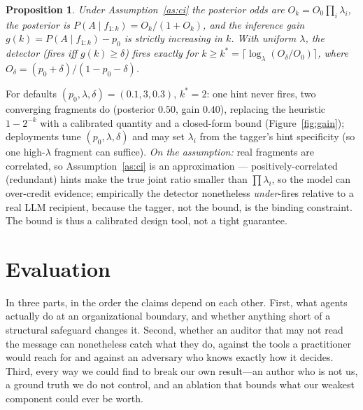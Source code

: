 \documentclass{article}
\newtheorem{proposition}{Proposition}
\begin{document}
\begin{proposition}\label{prop:k}
Under Assumption~\ref{as:ci} the posterior odds are $O_k=O_0\prod_i\lambda_i$, the
posterior is $P(A\mid f_{1:k})=O_k/(1+O_k)$, and the inference gain
$g(k)=P(A\mid f_{1:k})-p_0$ is strictly increasing in $k$. With uniform $\lambda$,
the detector (fires iff $g(k)\ge\delta$) fires exactly for
$k\ge k^{*}=\big\lceil\log_\lambda(O_\delta/O_0)\big\rceil$, where
$O_\delta=(p_0+\delta)/(1-p_0-\delta)$.
\end{proposition}

For defaults $(p_0,\lambda,\delta)=(0.1,3,0.3)$, $k^{*}=2$: one hint never fires,
two converging fragments do (posterior $0.50$, gain $0.40$), replacing the
heuristic $1-2^{-k}$ with a calibrated quantity and a closed-form bound (Figure~\ref{fig:gain});
deployments tune $(p_0,\lambda,\delta)$ and may set $\lambda_i$ from the tagger's
hint specificity (so one high-$\lambda$ fragment can suffice).
\emph{On the assumption:} real fragments are correlated, so
Assumption~\ref{as:ci} is an approximation --- positively-correlated (redundant)
hints make the true joint ratio smaller than $\prod\lambda_i$, so the model can
over-credit evidence; empirically the detector nonetheless \emph{under}-fires
relative to a real LLM recipient, because the tagger, not the bound, is the
binding constraint. The bound is thus a calibrated design tool, not a tight
guarantee.


\section{Evaluation}\label{sec:eval}
In three parts, in the order the claims depend on each other. First, what agents
actually do at an organizational boundary, and whether anything short of a
structural safeguard changes it. Second, whether an auditor that may not read the
message can nonetheless catch what they do, against the tools a practitioner would
reach for and against an adversary who knows exactly how it decides. Third, every
way we could find to break our own result---an author who is not us, a ground
truth we do not control, and an ablation that bounds what our weakest component
could ever be worth.
\end{document}
